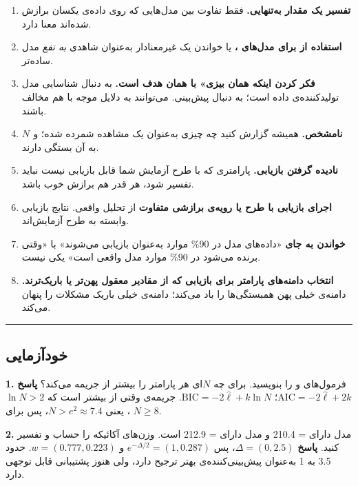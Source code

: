\begin{enumerate}
\def\labelenumi{\arabic{enumi}.}
\tightlist
\item
  \textbf{تفسیر یک مقدار  به‌تنهایی.} فقط تفاوت بین مدل‌هایی که
  روی داده‌ی یکسان برازش شده‌اند معنا دارد.
\item
  \textbf{استفاده از  برای مدل‌های ،} یا خواندن یک
   غیرمعنادار به‌عنوان شاهدی \emph{به نفع} مدل ساده‌تر.
\item
  \textbf{فکر کردن اینکه  همان  بیزی» با همان هدف است.}
   به دنبال شناسایی مدل تولیدکننده‌ی داده است؛  به دنبال
  پیش‌بینی. می‌توانند به دلایل موجه با هم مخالف باشند.
\item
  \textbf{\(N\) نامشخص.} همیشه گزارش کنید چه چیزی به‌عنوان یک مشاهده
  شمرده شده؛  و  به آن بستگی دارند.
\item
  \textbf{نادیده گرفتن بازیابی.} پارامتری که با طرح آزمایش شما قابل
  بازیابی نیست نباید تفسیر شود، هر قدر هم برازش خوب باشد.
\item
  \textbf{اجرای بازیابی با طرح یا رویه‌ی برازشی متفاوت} از تحلیل واقعی.
  نتایج بازیابی وابسته به طرح آزمایش‌اند.
\item
  \textbf{خواندن  به جای }
  «داده‌های مدل  در 90\% موارد به‌عنوان  بازیابی می‌شوند» با
  «وقتی  برنده می‌شود در 90\% موارد مدل واقعی است» یکی نیست.
\item
  \textbf{انتخاب دامنه‌های پارامتر برای بازیابی که از مقادیر معقول پهن‌تر
  یا باریک‌ترند.} دامنه‌ی خیلی پهن همبستگی‌ها را باد می‌کند؛ دامنه‌ی خیلی
  باریک مشکلات را پنهان می‌کند.
\end{enumerate}

\begin{center}\rule{0.5\linewidth}{0.5pt}\end{center}

\subsection{خودآزمایی}

\textbf{1.} فرمول‌های  و  را بنویسید. برای چه \(N\)ای
 هر پارامتر را بیشتر از  جریمه می‌کند؟ \textbf{پاسخ}
\(\mathrm{AIC} = -2\hat\ell + 2k\)؛
\(\mathrm{BIC} = -2\hat\ell + k\ln N\). جریمه‌ی  وقتی از 
بیشتر است که \(\ln N > 2\)، یعنی \(N > e^2 \approx 7.4\)، پس برای
\(N \ge 8\).

\textbf{2.} مدل  دارای  = 210.4 و مدل  دارای
 = 212.9 است. وزن‌های آکائیکه را حساب و تفسیر کنید. \textbf{پاسخ}
\(\Delta = (0, 2.5)\)، پس \(e^{-\Delta/2} = (1, 0.287)\) و
\(w = (0.777, 0.223)\).  حدود 3.5 به 1 به‌عنوان پیش‌بینی‌کننده‌ی بهتر
ترجیح دارد، ولی  هنوز پشتیبانی قابل توجهی دارد.

